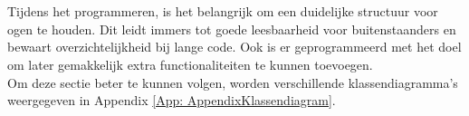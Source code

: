 \\
\\
Tijdens het programmeren, is het belangrijk om een duidelijke structuur voor ogen te houden. Dit leidt immers tot goede leesbaarheid voor buitenstaanders en bewaart overzichtelijkheid bij lange code. Ook is er geprogrammeerd met het doel om later gemakkelijk extra functionaliteiten te kunnen toevoegen.
\\
Om deze sectie beter te kunnen volgen, worden verschillende klassendiagramma's weergegeven in Appendix \ref{App: AppendixKlassendiagram}.